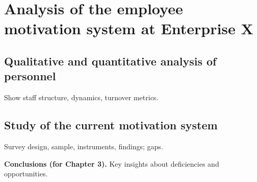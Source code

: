 \chapter{Analysis of the employee motivation system at Enterprise X}
\section{Qualitative and quantitative analysis of personnel}
Show staff structure, dynamics, turnover metrics.

\section{Study of the current motivation system}
Survey design, sample, instruments, findings; gaps.

\noindent\textbf{Conclusions (for Chapter 3).} Key insights about deficiencies and opportunities.
